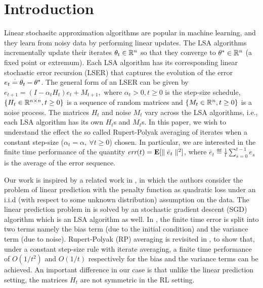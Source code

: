 \section{Introduction}
Linear stochasitc approximation algorithms are popular in machine learning, and they learn from noisy data by performing linear updates. The LSA algorithms incrementally update their iterates $\theta_t\in \mathbb{R}^n$ so that they converge to $\theta^*\in \mathbb{R}^n$ (a fixed point or extremum). Each LSA algorithm has its corresponding linear stochastic error recursion (LSER) that captures the evolution of the error $e_t\stackrel{\cdot}{=} \theta_t-\theta^*$. The general form of an LSER can be given by
$
e_{t+1}=(I-\alpha_t H_t)e_t+ M_{t+1},
$
where $\alpha_t>0,t\geq0$ is the step-size schedule, $\{H_t\in \mathbb{R}^{n\times n},t\geq 0\}$ is a sequence of random matrices and $\{M_t\in \mathbb{R}^n,t\geq 0\}$ is a noise process. The matrices $H_t$ and noise $M_t$ vary across the LSA algorithms, i.e., each LSA algorithm has its own $H_t$s and $M_t$s.
In this paper, we wish to understand the effect the so called Rupert-Polyak averaging of iterates when a constant step-size ($\alpha_t=\alpha,~\forall t\geq 0 $) chosen. In particular, we are interested in the finite time performance of the quantity $\emph{err}(t)=\mathbf{E}[\parallel\bar{e}_t\parallel^2]$, where $\bar{e}_t\eqdef \frac{1}{t}\sum_{s=0}^{t-1}e_s$ is the average of the error sequence.\par
Our work is inspired by a related work in \cite{bachaistats}, in which the authors consider the problem of linear prediction with the penalty function as quadratic loss under an i.i.d  (with respect to some unknown distribution) assumption on the data. The linear prediction problem in \cite{bachaistats} is solved by an stochastic gradient descent (SGD) algorithm which is an LSA algorithm as well. In \cite{bachaistats}, the finite time error is split into two terms namely the bias term (due to the initial condition) and the variance term (due to noise). Rupert-Polyak (RP) averaging is revisited in \cite{bachaistats}, to show that, under a constant step-size rule with iterate averaging, a finite time performance of $O(1/t^2)$ and $O(1/t)$ respectively for the bias and the variance terms can be achieved. An important difference in our case is that unlike the linear prediction setting, the matrices $H_t$ are not symmetric in the RL setting.\par
